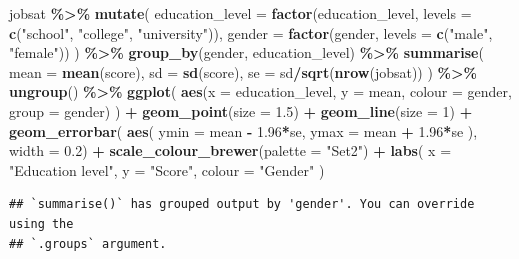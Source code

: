 \documentclass[
]{book}
\newenvironment{Shaded}{\begin{snugshade}}{\end{snugshade}}
\newcommand{\AttributeTok}[1]{\textcolor[rgb]{0.13,0.29,0.53}{#1}}
\newcommand{\DecValTok}[1]{\textcolor[rgb]{0.00,0.00,0.81}{#1}}
\newcommand{\FloatTok}[1]{\textcolor[rgb]{0.00,0.00,0.81}{#1}}
\newcommand{\FunctionTok}[1]{\textcolor[rgb]{0.13,0.29,0.53}{\textbf{#1}}}
\newcommand{\NormalTok}[1]{#1}
\newcommand{\SpecialCharTok}[1]{\textcolor[rgb]{0.81,0.36,0.00}{\textbf{#1}}}
\newcommand{\StringTok}[1]{\textcolor[rgb]{0.31,0.60,0.02}{#1}}
\begin{document}
\begin{Shaded}
\begin{Highlighting}[]
\NormalTok{jobsat }\SpecialCharTok{\%\textgreater{}\%}
  \FunctionTok{mutate}\NormalTok{(}
    \AttributeTok{education\_level =} \FunctionTok{factor}\NormalTok{(education\_level, }\AttributeTok{levels =} \FunctionTok{c}\NormalTok{(}\StringTok{"school"}\NormalTok{, }\StringTok{"college"}\NormalTok{, }\StringTok{"university"}\NormalTok{)),}
    \AttributeTok{gender =} \FunctionTok{factor}\NormalTok{(gender, }\AttributeTok{levels =} \FunctionTok{c}\NormalTok{(}\StringTok{"male"}\NormalTok{, }\StringTok{"female"}\NormalTok{))}
\NormalTok{  ) }\SpecialCharTok{\%\textgreater{}\%}
  \FunctionTok{group\_by}\NormalTok{(gender, education\_level) }\SpecialCharTok{\%\textgreater{}\%}
  \FunctionTok{summarise}\NormalTok{(}
    \AttributeTok{mean =} \FunctionTok{mean}\NormalTok{(score),}
    \AttributeTok{sd =} \FunctionTok{sd}\NormalTok{(score),}
    \AttributeTok{se =}\NormalTok{ sd}\SpecialCharTok{/}\FunctionTok{sqrt}\NormalTok{(}\FunctionTok{nrow}\NormalTok{(jobsat))}
\NormalTok{  ) }\SpecialCharTok{\%\textgreater{}\%}
  \FunctionTok{ungroup}\NormalTok{() }\SpecialCharTok{\%\textgreater{}\%}
  \FunctionTok{ggplot}\NormalTok{(}
    \FunctionTok{aes}\NormalTok{(}\AttributeTok{x =}\NormalTok{ education\_level, }\AttributeTok{y =}\NormalTok{ mean, }\AttributeTok{colour =}\NormalTok{ gender, }\AttributeTok{group =}\NormalTok{ gender)}
\NormalTok{  ) }\SpecialCharTok{+}
  \FunctionTok{geom\_point}\NormalTok{(}\AttributeTok{size =} \FloatTok{1.5}\NormalTok{) }\SpecialCharTok{+}
  \FunctionTok{geom\_line}\NormalTok{(}\AttributeTok{size =} \DecValTok{1}\NormalTok{) }\SpecialCharTok{+}
  \FunctionTok{geom\_errorbar}\NormalTok{(}
    \FunctionTok{aes}\NormalTok{(}
      \AttributeTok{ymin =}\NormalTok{ mean }\SpecialCharTok{{-}} \FloatTok{1.96}\SpecialCharTok{*}\NormalTok{se,}
      \AttributeTok{ymax =}\NormalTok{ mean }\SpecialCharTok{+} \FloatTok{1.96}\SpecialCharTok{*}\NormalTok{se}
\NormalTok{    ), }\AttributeTok{width =} \FloatTok{0.2}\NormalTok{) }\SpecialCharTok{+}
  \FunctionTok{scale\_colour\_brewer}\NormalTok{(}\AttributeTok{palette =} \StringTok{"Set2"}\NormalTok{) }\SpecialCharTok{+}
  \FunctionTok{labs}\NormalTok{(}
    \AttributeTok{x =} \StringTok{"Education level"}\NormalTok{, }\AttributeTok{y =} \StringTok{"Score"}\NormalTok{, }\AttributeTok{colour =} \StringTok{"Gender"}
\NormalTok{  )}
\end{Highlighting}
\end{Shaded}

\begin{verbatim}
## `summarise()` has grouped output by 'gender'. You can override using the
## `.groups` argument.
\end{verbatim}
\end{document}
